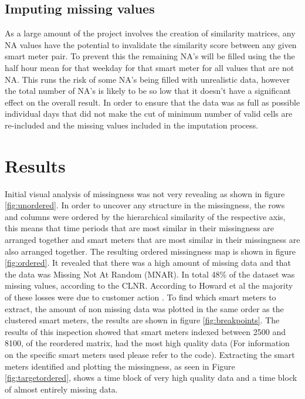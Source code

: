 \subsection{Imputing missing values}
\label{sec:imputation}
As a large amount of the project involves the creation of similarity matrices, any NA values have the potential to invalidate the similarity score between any given smart meter pair. To prevent this the remaining NA's will be filled using the the half hour mean for that weekday for that smart meter for all values that are not NA. This runs the risk of some NA's being filled with unrealistic data, however the total number of NA's is likely to be so low that it doesn't have a significant effect on the overall result. In order to ensure that the data was as full as possible individual days that did not make the cut of minimum number of valid cells are re-included and the missing values included in the imputation process.

\section{Results}

Initial visual analysis of missingness was not very revealing as shown in figure \ref{fig:unordered}. In order to uncover any structure in the missingness, the rows and columns were ordered by the hierarchical similarity of the respective axis, this means that time periods that are most similar in their missingness are arranged together and smart meters that are most similar in their missingness are also arranged together. The resulting ordered missingness map is shown in figure \ref{fig:ordered}. It revealed that there was a high amount of missing data and that the data was Missing Not At Random (MNAR). In total 48\% of the dataset was missing values, according to the CLNR. According to Howard et al \cite{howard2015} the majority of these losses were due to customer action . To find which smart meters to extract, the amount of non missing data was plotted in the same order as the clustered smart meters, the results are shown in figure \ref{fig:breakpoints}. The results of this inspection showed that smart meters indexed between 2500 and 8100, of the reordered matrix, had the most high quality data (For information on the specific smart meters used please refer to the code). Extracting the smart meters identified and plotting the missingness, as seen in Figure \ref{fig:targetordered}, shows a time block of very high quality data and a time block of almost entirely missing data. 

